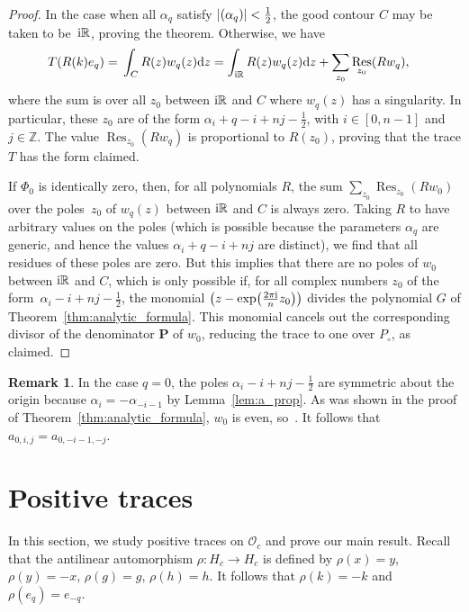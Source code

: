\documentclass[pdftex]{sigma}
\newcommand\ZZ{\mathbb{Z}}
\newcommand\RR{\mathbb{R}}
\newcommand\cO{\mathcal{O}}
\DeclareMathOperator\Res{Res}
\newcommand\bP{\textbf{P}}
\renewcommand\d{\mathrm{d}}
\let\Re\relax
\DeclareMathOperator\Re{Re}
\newcommand\half{\ensuremath{\frac{1}{2}}}
\numberwithin{equation}{section}
\theoremstyle{definition}
\newtheorem{Remark}[Theorem]{Remark}
\begin{document}
\begin{proof}
 In the case when all $\alpha_q$ satisfy $|{\Re(\alpha_q)}| < \half$,
 the good contour $C$ may be taken to be~${\rm i}\RR$, proving the theorem.
 Otherwise, we have
 \begin{align*}
 T(R(k) e_q) ={}& \int_C R(z) w_q(z) \d z = \int_{{\rm i}\RR} R(z) w_q(z) \d z + \sum_{z_0} \Res_{z_0} (R w_q),
 \end{align*}
 where the sum is over all $z_0$ between ${\rm i}\RR$ and $C$
 where $w_q(z)$ has a singularity.
 In particular, these $z_0$ are of the form $\alpha_i + q - i + nj - \half$,
 with $i \in [0, n - 1]$ and $j \in \ZZ$.
 The value $\Res_{z_0} (R w_q)$ is proportional to $R(z_0)$,
 proving that the trace $T$ has the form claimed.

 If $\Phi_0$ is identically zero, then, for all polynomials $R$,
 the sum $\sum_{z_0} \Res_{z_0} (Rw_0)$
 over the poles~$z_0$ of $w_q(z)$ between ${\rm i}\RR$ and $C$
 is always zero.
 Taking $R$ to have arbitrary values on the poles
 (which is possible because the parameters $\alpha_q$ are generic,
 and hence the values $\alpha_i + q - i + nj$ are distinct),
 we find that all residues of these poles are zero.
 But this implies that there are no poles of $w_0$ between ${\rm i}\RR$ and $C$,
 which is only possible if, for all
 complex numbers $z_0$ of the form~${\alpha_i - i + nj - \half}$,
 the monomial $\bigl(z - \exp\bigl(\frac{2\pi {\rm i}}{n} z_0\bigr)\bigr)$ divides
 the polynomial $G$ of Theorem~\ref{thm:analytic_formula}.
 This monomial cancels out the corresponding divisor
 of the denominator $\bP$ of $w_0$,
 reducing the trace to one over $P_\circ$,
 as claimed.
\end{proof}

\begin{Remark}
 \label{rem:phi_0}
 In the case $q = 0$,
 the poles $\alpha_i - i + nj - \half$ are symmetric about the origin
 because $\alpha_i = -\alpha_{-i - 1}$ by Lemma~\ref{lem:a_prop}.
 As was shown in the proof of Theorem~\ref{thm:analytic_formula},
 $w_0$ is even, so~\smash{$\Res_{\alpha_i - i + nj - \half} (w_0) =
 \Res_{\alpha_{-i - 1} + i - nj + \half} (w_0)$}.
 It follows that $a_{0, i, j} = a_{0, -i - 1, -j}$.
\end{Remark}


\section{Positive traces}
\label{sec:pos}

In this section, we study positive traces on $\cO_c$
and prove our main result.
Recall that
the antilinear automorphism $\rho \colon H_c \rightarrow H_c$
is defined by
$\rho(x) = y$, $\rho(y) = -x$, $\rho(g) = g$, $\rho(h) = h$.
It follows that $\rho(k) = -k$ and $\rho(e_q) = e_{-q}$.
\end{document}
